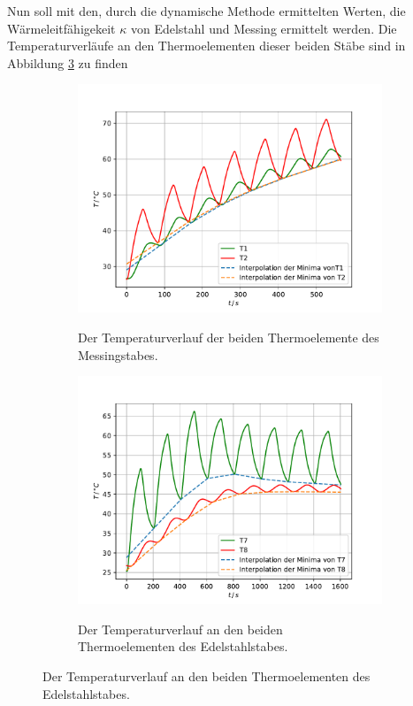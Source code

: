 Nun soll mit den, durch die dynamische Methode ermittelten Werten, die Wärmeleitfähigekeit $\kappa$ von Edelstahl und Messing ermittelt werden.
Die Temperaturverläufe an den Thermoelementen dieser beiden Stäbe sind in Abbildung \ref{fig:dyn} zu finden
\begin{figure}
    \centering
    \caption{Zwei Temperaturverläufe von zwei Metallen.}
    \begin{subfigure}{\textwidth/2}
        \centering
        \caption{Der Temperaturverlauf der beiden Thermoelemente des Messingstabes.}
        \includegraphics[width = \textwidth]{content/data/dynamisch_T1_T2.pdf}
        \label{fig:dyn_T1_T2}
    \end{subfigure}
    \begin{subfigure}{\textwidth/2}
        \centering
        \caption{Der Temperaturverlauf an den beiden Thermoelementen des Edelstahlstabes.}
        \includegraphics[width=\textwidth]{content/data/dynamisch_T7_T8.pdf}
        \label{fig:dyn_T7_T8}
    \end{subfigure}
\label{fig:dyn}
\end{figure}

